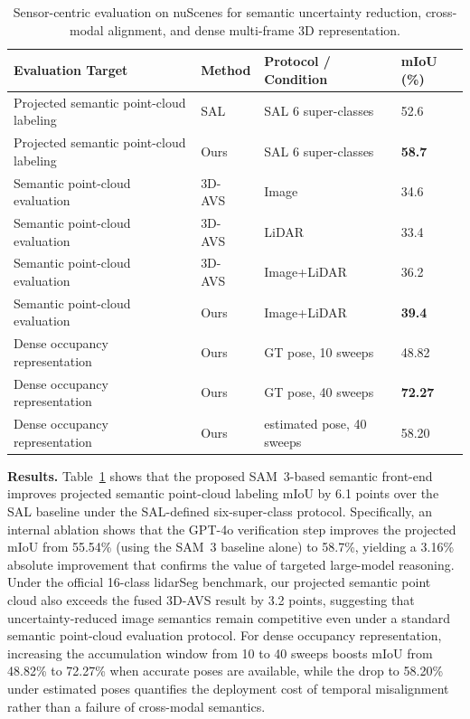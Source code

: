 \documentclass{IEEE_lsens/IEEE_lsens}
\begin{document}
\begin{table}[!t]
  \caption{Sensor-centric evaluation on nuScenes for semantic uncertainty reduction, cross-modal alignment, and dense multi-frame 3D representation.}
  \label{tab:comprehensive}
  \centering
  \scriptsize
  \setlength{\tabcolsep}{5pt}
  \begin{tabular}{llll}
    \toprule
    Evaluation Target & Method & Protocol / Condition & mIoU (\%) \\
    \midrule
    Projected semantic point-cloud labeling & SAL~\cite{sal} & SAL 6 super-classes & 52.6 \\
    Projected semantic point-cloud labeling & Ours & SAL 6 super-classes & \textbf{58.7} \\
    Semantic point-cloud evaluation & 3D-AVS~\cite{three_d_avs} & Image & 34.6 \\
    Semantic point-cloud evaluation & 3D-AVS~\cite{three_d_avs} & LiDAR & 33.4 \\
    Semantic point-cloud evaluation & 3D-AVS~\cite{three_d_avs} & Image+LiDAR & 36.2 \\
    Semantic point-cloud evaluation & Ours & Image+LiDAR & \textbf{39.4} \\
    Dense occupancy representation & Ours & GT pose, 10 sweeps & 48.82 \\
    Dense occupancy representation & Ours & GT pose, 40 sweeps & \textbf{72.27} \\
    Dense occupancy representation & Ours & estimated pose, 40 sweeps & 58.20 \\
    \bottomrule
  \end{tabular}
\end{table}

\textbf{Results.} Table~\ref{tab:comprehensive} shows that the proposed SAM~3-based semantic front-end improves projected semantic point-cloud labeling mIoU by 6.1 points over the SAL baseline under the SAL-defined six-super-class protocol. Specifically, an internal ablation shows that the GPT-4o verification step improves the projected mIoU from 55.54\% (using the SAM~3 baseline alone) to 58.7\%, yielding a 3.16\% absolute improvement that confirms the value of targeted large-model reasoning. Under the official 16-class lidarSeg benchmark, our projected semantic point cloud also exceeds the fused 3D-AVS result by 3.2 points, suggesting that uncertainty-reduced image semantics remain competitive even under a standard semantic point-cloud evaluation protocol. For dense occupancy representation, increasing the accumulation window from 10 to 40 sweeps boosts mIoU from 48.82\% to 72.27\% when accurate poses are available, while the drop to 58.20\% under estimated poses quantifies the deployment cost of temporal misalignment rather than a failure of cross-modal semantics.
\end{document}
